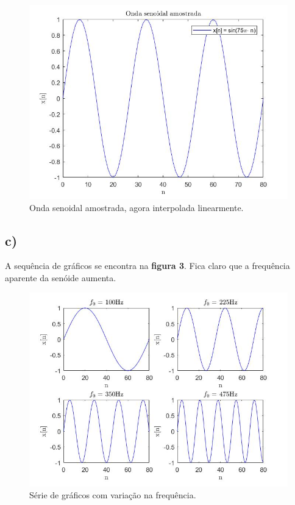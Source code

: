 \documentclass[a4paper, 12pt]{article}
\begin{document}
\begin{figure}[H]
	\centering
	\includegraphics[scale=0.5]{../Imagens/ex1/b.jpg} 
	\caption{Onda senoidal amostrada, agora interpolada linearmente.}
	\label{fig:1b}
\end{figure}

\subsection{c)}

A sequência de gráficos se encontra na \textbf{figura 3}. Fica claro que a frequência aparente da senóide aumenta.



\begin{figure}[H]
	\centering
	\includegraphics[scale=0.5]{../Imagens/ex1/c.jpg} 
	\caption{Série de gráficos com variação na frequência.}
	\label{fig:1c}
\end{figure}
\end{document}
